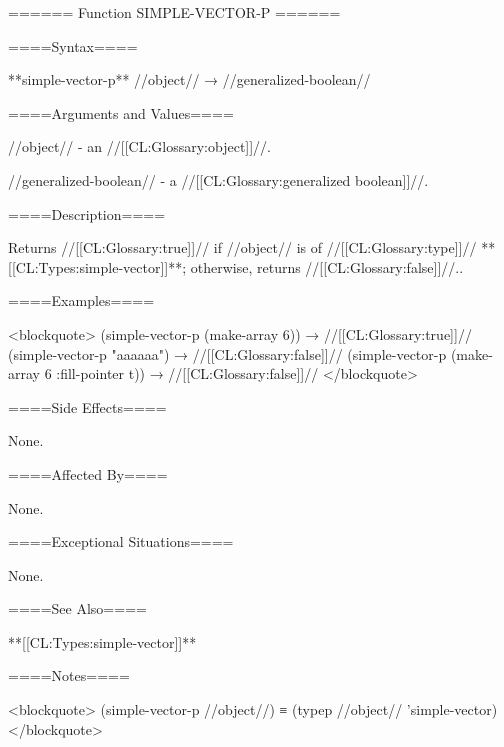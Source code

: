 ====== Function SIMPLE-VECTOR-P ======

====Syntax====

**simple-vector-p** //object// → //generalized-boolean//

====Arguments and Values====

//object// - an //[[CL:Glossary:object]]//.

//generalized-boolean// - a //[[CL:Glossary:generalized boolean]]//.

====Description====

Returns //[[CL:Glossary:true]]// if //object// is of //[[CL:Glossary:type]]// **[[CL:Types:simple-vector]]**; otherwise, returns //[[CL:Glossary:false]]//..

====Examples====

<blockquote> (simple-vector-p (make-array 6)) → //[[CL:Glossary:true]]// (simple-vector-p "aaaaaa") → //[[CL:Glossary:false]]// (simple-vector-p (make-array 6 :fill-pointer t)) → //[[CL:Glossary:false]]// </blockquote>

====Side Effects====

None.

====Affected By====

None.

====Exceptional Situations====

None.

====See Also====

**[[CL:Types:simple-vector]]**

====Notes====

<blockquote> (simple-vector-p //object//) ≡ (typep //object// 'simple-vector) </blockquote>

